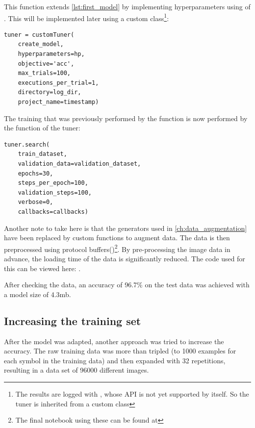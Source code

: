 This function extends \ref{lst:first_model} by implementing hyperparameters using  of .
This will be implemented later using a custom class\footnote{The results are logged with , whose API is not yet supported by  itself. So the tuner is inherited from a custom class}:

\begin{lstlisting}[caption={Definition of model tuner.}]
tuner = customTuner(
    create_model,
    hyperparameters=hp,
    objective='acc',
    max_trials=100,
    executions_per_trial=1,
    directory=log_dir,
    project_name=timestamp)
\end{lstlisting}

The training that was previously performed by the  function is now performed by the  function of the tuner:

\begin{lstlisting}[caption={Searching the best model.}]
tuner.search(
    train_dataset,
    validation_data=validation_dataset,
    epochs=30,
    steps_per_epoch=100,
    validation_steps=100,
    verbose=0,
    callbacks=callbacks)
\end{lstlisting}

Another note to take here is that the generators used in \ref{ch:data_augmentation} have been replaced by custom functions to augment data. The data is then preprocessed using protocol buffers()\footnote{The final notebook using these can be found at }.
By pre-processing the image data in advance, the loading time of the data is significantly reduced.
The code used for this can be viewed here: .

After checking the data, an accuracy of 96.7\% on the test data was achieved with a model size of 4.3mb.

\subsection{Increasing the training set}

After the model was adapted, another approach was tried to increase the accuracy.
The raw training data was more than tripled (to 1000 examples for each symbol in the training data) and then expanded with 32 repetitions, resulting in a data set of 96000 different images.


